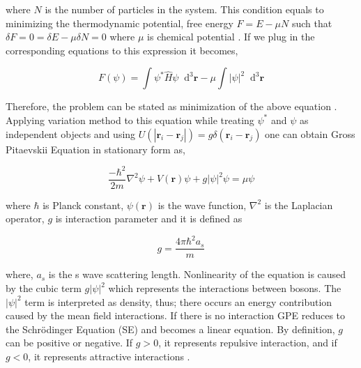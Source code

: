 \documentclass[a4paper,times,hidelinks,12pt]{article}
\newcommand*\dif{\mathop{}\!\mathrm{d}}
\begin{document}
\noindent where $N$ is the number of particles in the system. This condition equals to minimizing the thermodynamic potential, free energy $F = E - \mu N$ such that $\delta F = 0 = \delta E - \mu \delta N = 0$ where $\mu$ is chemical potential \cite{pethick2002bose}. If we plug in the corresponding equations to this expression it becomes,  

\begin{equation}
\label{eq:GPE_derivation_free_energy}
F(\psi) = \int \psi^{*}\hat{H}\psi \dif^3\boldsymbol{r} - \mu \int |\psi|^2 \dif^3\boldsymbol{r}
\end{equation}

\noindent Therefore, the problem can be stated as minimization of the above equation \cite{rogel2013gross}. Applying variation method to this equation while treating $\psi^{*}$
and $\psi$ as independent objects and using $U(|\boldsymbol{r}_i - \boldsymbol{r}_j|) = g\delta(\boldsymbol{r}_i - \boldsymbol{r}_j)$ one can obtain Gross Pitaevskii Equation in stationary form as, 

\begin{equation}
\label{eq:GPE_time_indep}
\frac{-\hbar^2}{2m}\nabla^2\psi + V(\boldsymbol{r})\psi + g|\psi|^2\psi = \mu\psi
\end{equation}

%

\noindent where $\hbar$ is Planck constant, $\psi(\boldsymbol{r})$ is the wave function, $\nabla^2$ is the Laplacian operator, $g$ is interaction parameter and it is defined as 

\begin{equation}
\label{eq:GPE_inter_param}
g=\frac{4\pi\hbar^2a_s}{m}
\end{equation}

\noindent where, $a_s$ is the s wave scattering length. Nonlinearity of the equation is caused by the cubic term $g|\psi|^2$ which represents the interactions between bosons. The $|\psi|^2$ term is interpreted as density, thus; there occurs an energy contribution caused by the mean field interactions. If there is no interaction GPE reduces to the Schr{\"o}dinger Equation (SE) and becomes a linear equation. By definition, $g$ can be positive or negative. If $g > 0$, it represents repulsive interaction, and if $g < 0$, it represents attractive interactions \cite{pitaevskii2016bose}.
\end{document}
